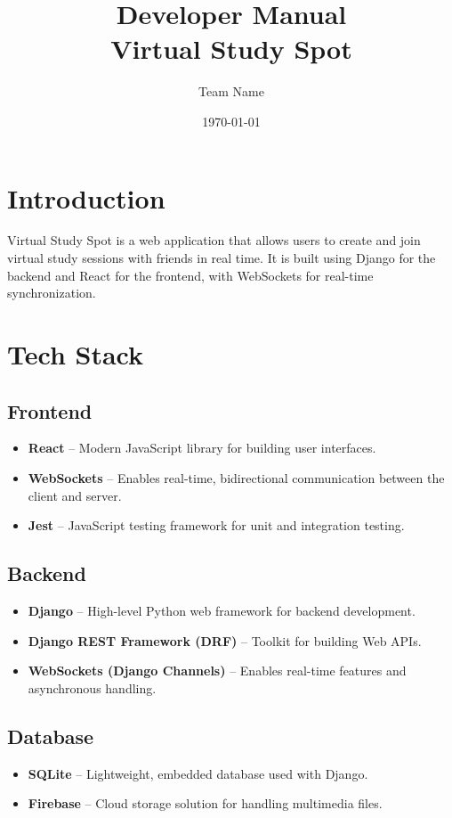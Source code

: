 \documentclass[a4paper,12pt]{article}
\title{\textbf{Developer Manual} \\ Virtual Study Spot}
\author{Team Name}
\date{\today}
\begin{document}
\maketitle

\section{Introduction}
Virtual Study Spot is a web application that allows users to create and join virtual study sessions with friends in real time. It is built using Django for the backend and React for the frontend, with WebSockets for real-time synchronization.

\section{Tech Stack}

\subsection{Frontend}
\begin{itemize}
    \item \textbf{React} – Modern JavaScript library for building user interfaces.
    \item \textbf{WebSockets} – Enables real-time, bidirectional communication between the client and server.
    \item \textbf{Jest} – JavaScript testing framework for unit and integration testing.
\end{itemize}

\subsection{Backend}
\begin{itemize}
    \item \textbf{Django} – High-level Python web framework for backend development.
    \item \textbf{Django REST Framework (DRF)} – Toolkit for building Web APIs.
    \item \textbf{WebSockets (Django Channels)} – Enables real-time features and asynchronous handling.
\end{itemize}

\subsection{Database}
\begin{itemize}
    \item \textbf{SQLite} – Lightweight, embedded database used with Django.
    \item \textbf{Firebase} – Cloud storage solution for handling multimedia files.
\end{itemize}
\end{document}
